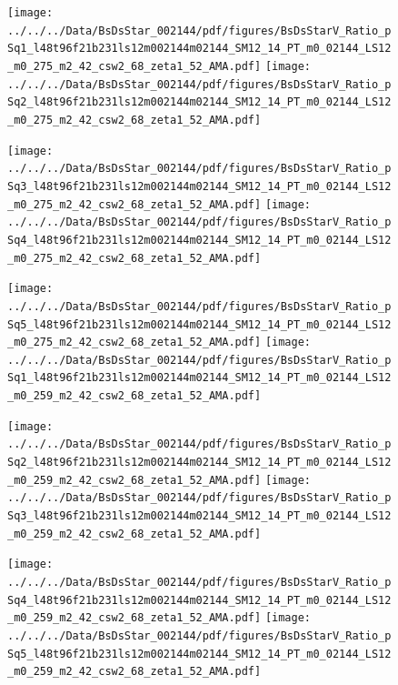 \documentclass[a4paper,10pt]{article}
\begin{document}
\begin{figure}[p]
 \texttt{[image: ../../../Data/BsDsStar\_002144/pdf/figures/BsDsStarV\_Ratio\_pSq1\_l48t96f21b231ls12m002144m02144\_SM12\_14\_PT\_m0\_02144\_LS12\_m0\_275\_m2\_42\_csw2\_68\_zeta1\_52\_AMA.pdf]} 
 \texttt{[image: ../../../Data/BsDsStar\_002144/pdf/figures/BsDsStarV\_Ratio\_pSq2\_l48t96f21b231ls12m002144m02144\_SM12\_14\_PT\_m0\_02144\_LS12\_m0\_275\_m2\_42\_csw2\_68\_zeta1\_52\_AMA.pdf]} 
 \end{figure}
\begin{figure}[p]
 \texttt{[image: ../../../Data/BsDsStar\_002144/pdf/figures/BsDsStarV\_Ratio\_pSq3\_l48t96f21b231ls12m002144m02144\_SM12\_14\_PT\_m0\_02144\_LS12\_m0\_275\_m2\_42\_csw2\_68\_zeta1\_52\_AMA.pdf]} 
 \texttt{[image: ../../../Data/BsDsStar\_002144/pdf/figures/BsDsStarV\_Ratio\_pSq4\_l48t96f21b231ls12m002144m02144\_SM12\_14\_PT\_m0\_02144\_LS12\_m0\_275\_m2\_42\_csw2\_68\_zeta1\_52\_AMA.pdf]} 
 \end{figure}
\begin{figure}[p]
 \texttt{[image: ../../../Data/BsDsStar\_002144/pdf/figures/BsDsStarV\_Ratio\_pSq5\_l48t96f21b231ls12m002144m02144\_SM12\_14\_PT\_m0\_02144\_LS12\_m0\_275\_m2\_42\_csw2\_68\_zeta1\_52\_AMA.pdf]} 
 \texttt{[image: ../../../Data/BsDsStar\_002144/pdf/figures/BsDsStarV\_Ratio\_pSq1\_l48t96f21b231ls12m002144m02144\_SM12\_14\_PT\_m0\_02144\_LS12\_m0\_259\_m2\_42\_csw2\_68\_zeta1\_52\_AMA.pdf]} 
 \end{figure}
\clearpage
\begin{figure}[p]
 \texttt{[image: ../../../Data/BsDsStar\_002144/pdf/figures/BsDsStarV\_Ratio\_pSq2\_l48t96f21b231ls12m002144m02144\_SM12\_14\_PT\_m0\_02144\_LS12\_m0\_259\_m2\_42\_csw2\_68\_zeta1\_52\_AMA.pdf]} 
 \texttt{[image: ../../../Data/BsDsStar\_002144/pdf/figures/BsDsStarV\_Ratio\_pSq3\_l48t96f21b231ls12m002144m02144\_SM12\_14\_PT\_m0\_02144\_LS12\_m0\_259\_m2\_42\_csw2\_68\_zeta1\_52\_AMA.pdf]} 
 \end{figure}
\begin{figure}[p]
 \texttt{[image: ../../../Data/BsDsStar\_002144/pdf/figures/BsDsStarV\_Ratio\_pSq4\_l48t96f21b231ls12m002144m02144\_SM12\_14\_PT\_m0\_02144\_LS12\_m0\_259\_m2\_42\_csw2\_68\_zeta1\_52\_AMA.pdf]} 
 \texttt{[image: ../../../Data/BsDsStar\_002144/pdf/figures/BsDsStarV\_Ratio\_pSq5\_l48t96f21b231ls12m002144m02144\_SM12\_14\_PT\_m0\_02144\_LS12\_m0\_259\_m2\_42\_csw2\_68\_zeta1\_52\_AMA.pdf]} 
 \end{figure}
\clearpage
\end{document}
